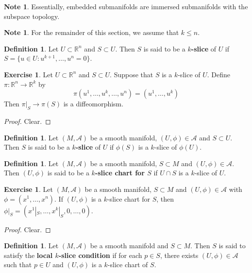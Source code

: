 \documentclass[12pt]{amsart}
\theoremstyle{definition}
\newtheorem{defn}[definition]{Definition}
\newtheorem{note}[definition]{Note}
\newtheorem{ex}[definition]{Exercise}
\newcommand{\R}{\mathbb{R}}
\newcommand{\MA}{\mathcal{A}}
\begin{document}
	\begin{note}
	Essentially, embedded submanifolds are immersed submanifolds with the subspace topology.
	\end{note}
	
	\begin{note}
	For the remainder of this section, we assume that $k \leq n$.
	\end{note}
	
	\begin{defn}
	Let $U \subset \R^n$ and $S \subset U$. Then $S$ is said to be a \textbf{$k$-slice} of $U$ if $S = \{u \in U: u^{k+1}, \dots, u^{n} = 0\}$.
	\end{defn}	
	
	\begin{ex}
	Let $U \subset \R^n$ and $S \subset U$. Suppose that $S$ is a $k$-slice of $U$. Define $\pi: \R^n \rightarrow \R^k$ by $$\pi(u^1, \dots, u^k, \dots, u^n) = (u^1, \dots, u^k)$$ Then $\pi|_{S} \rightarrow \pi(S)$ is a diffeomorphism.
	\end{ex}	
	
	\begin{proof}
	Clear.
	\end{proof}
	
	\begin{defn}
	Let $(M, \MA)$ be a smooth manifold, $(U, \phi) \in \MA$ and $S \subset U$. Then $S$ is said to be a \textbf{$k$-slice} of $U$ if $\phi(S)$ is a $k$-slice of $\phi(U)$.
	\end{defn}	
	
	\begin{defn}
	Let $(M, \MA)$ be a smooth manifold, $S \subset M$ and $(U, \phi) \in \MA$. Then $(U, \phi)$ is said to be a \textbf{$k$-slice chart for $S$} if $U \cap S$ is a $k$-slice of $U$.
	\end{defn}	
	
	\begin{ex}
	Let $(M, \MA)$ be a smooth manifold, $S \subset M$ and $(U, \phi) \in \MA$ with $\phi = (x^1, \dots, x^n)$. If $(U, \phi)$ is a $k$-slice chart for $S$, then $\phi|_S = (x^1|_S, \dots, x^k|_S, 0, \dots, 0)$.
	\end{ex}
	
	\begin{proof}
	Clear. 
	\end{proof}
	
	\begin{defn}
	Let $(M, \MA)$ be a smooth manifold and $S \subset M$. Then $S$ is said to satisfy the \textbf{local $k$-slice condition} if for each $p \in S$, there exists $(U, \phi) \in \MA$ such that $p \in U$ and $(U, \phi)$ is a $k$-slice chart of $S$.
	\end{defn}
	
\end{document}
